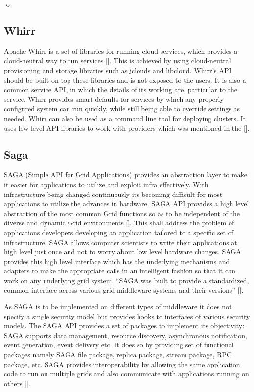     -o-

\subsection{Whirr}
     
Apache Whirr is a set of libraries for running cloud services, which
provides a cloud-neutral way to run
services [\cite{www-ApacheWhirr}]. This is achieved by using
cloud-neutral provisioning and storage libraries such as jclouds and
libcloud. Whirr's API should be built on top these libraries and is
not exposed to the users. It is also a common service API, in which
the details of its working are, particular to the service.  Whirr
provides smart defaults for services by which any properly configured
system can run quickly, while still being able to override settings as
needed. Whirr can also be used as a command line tool for deploying
clusters. It uses low level API libraries to work with providers which
was mentioned in the [\cite{www-slideshare-ApacheWhirr}].

     
\subsection{Saga}

SAGA (Simple API for Grid Applications) provides an abstraction layer
to make it easier for applications to utilize and exploit infra
effectively. With infrastructure being changed continuously its
becoming difficult for most applications to utilize the advances in
hardware. SAGA API provides a high level abstraction of the most
common Grid functions so as to be independent of the diverse and
dynamic Grid environments [\cite{saga-paper}]. This shall address the
problem of applications developers developing an application tailored
to a specific set of infrastructure.  SAGA allows computer scientists
to write their applications at high level just once and not to worry
about low level hardware changes. SAGA provides this high level
interface which has the underlying mechanisms and adapters to make the
appropriate calls in an intelligent fashion so that it can work on any
underlying grid system. ``SAGA was built to provide a standardized,
common interface across various grid middleware systems and their
versions'' [\cite{www-saga-ogf-document}].

As SAGA is to be implemented on different types of middleware it does
not specify a single security model but provides hooks to interfaces
of various security models. The SAGA API provides a set of packages to
implement its objectivity: SAGA supports data management, resource
discovery, asynchronous notification, event generation, event delivery
etc. It does so by providing set of functional packages namely SAGA
file package, replica package, stream package, RPC package, etc. SAGA
provides interoperability by allowing the same application code to run
on multiple grids and also communicate with applications running on
others [\cite{saga-paper}].


